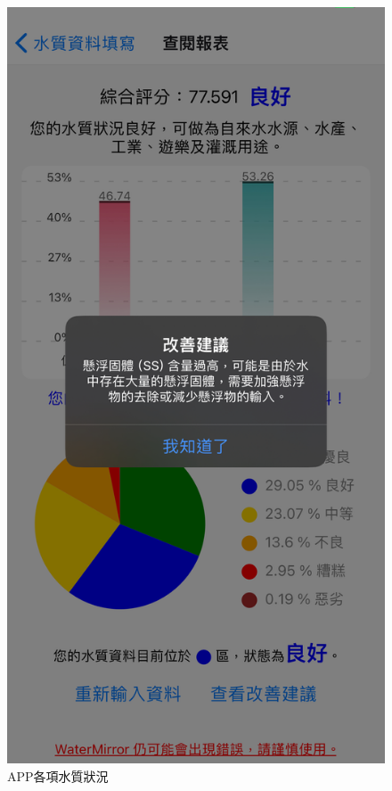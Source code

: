 \documentclass[12pt,a4paper]{article}
\begin{document}
\begin{enumerate}
\begin{enumerate}[label=\arabic*.]
\begin{enumerate}[label=3-2-\arabic*.]
\begin{figure}[H]
\begin{minipage}{0.3\textwidth}
                    \caption{APP各項水質狀況}
                \end{minipage}%
                \hfill
                \begin{minipage}{0.3\textwidth}
                    \centering
                    \includegraphics[width=\textwidth]{resources/image/front-end/APP改善說明.png}

\end{minipage}
\end{figure}
\end{enumerate}
\end{enumerate}
\end{enumerate}
\end{document}
